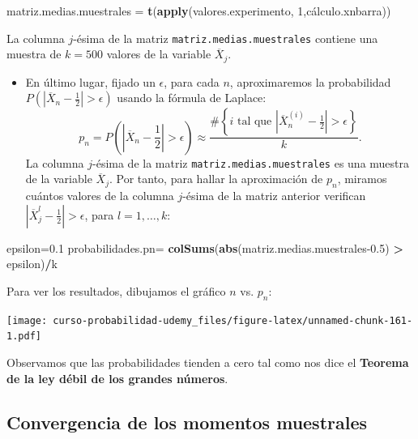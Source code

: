 \documentclass[]{book}
\newenvironment{Shaded}{\begin{snugshade}}{\end{snugshade}}
\newcommand{\DecValTok}[1]{\textcolor[rgb]{0.00,0.00,0.81}{#1}}
\newcommand{\FloatTok}[1]{\textcolor[rgb]{0.00,0.00,0.81}{#1}}
\newcommand{\KeywordTok}[1]{\textcolor[rgb]{0.13,0.29,0.53}{\textbf{#1}}}
\newcommand{\NormalTok}[1]{#1}
\newcommand{\OperatorTok}[1]{\textcolor[rgb]{0.81,0.36,0.00}{\textbf{#1}}}
\newcommand{\StringTok}[1]{\textcolor[rgb]{0.31,0.60,0.02}{#1}}
\providecommand{\tightlist}{%
  \setlength{\itemsep}{0pt}\setlength{\parskip}{0pt}}
\begin{document}
\begin{Shaded}
\begin{Highlighting}[]
\NormalTok{matriz.medias.muestrales =}\StringTok{ }\KeywordTok{t}\NormalTok{(}\KeywordTok{apply}\NormalTok{(valores.experimento,}
                                   \DecValTok{1}\NormalTok{,cálculo.xnbarra))}
\end{Highlighting}
\end{Shaded}

La columna \(j\)-ésima de la matriz \texttt{matriz.medias.muestrales} contiene una muestra de \(k=500\) valores de la variable \(\overline{X}_j\).

\begin{itemize}
\tightlist
\item
  En último lugar, fijado un \(\epsilon\), para cada \(n\), aproximaremos la probabilidad \(P\left(\left|\overline{X}_n-\frac{1}{2}\right|>\epsilon\right)\) usando la fórmula de Laplace:
  \[
  p_n=P\left(\left|\overline{X}_n-\frac{1}{2}\right|>\epsilon\right) \approx\frac{\#\left\{\mbox{$i$ tal que  $\left|\overline{X}_n^{(i)}-\frac{1}{2}\right|>\epsilon$}\right\}}{k}.
  \]
  La columna \(j\)-ésima de la matriz \texttt{matriz.medias.muestrales} es una muestra de la variable \(\overline{X}_j\). Por tanto, para hallar la aproximación de \(p_n\), miramos cuántos valores de la columna \(j\)-ésima de la matriz anterior verifican \(\left|\overline{X}_j^{l}-\frac{1}{2}\right|>\epsilon\), para \(l=1,\ldots, k\):
\end{itemize}

\begin{Shaded}
\begin{Highlighting}[]
\NormalTok{epsilon=}\FloatTok{0.1}
\NormalTok{probabilidades.pn=}\StringTok{ }\KeywordTok{colSums}\NormalTok{(}\KeywordTok{abs}\NormalTok{(matriz.medias.muestrales}\FloatTok{-0.5}\NormalTok{) }\OperatorTok{>}\StringTok{ }\NormalTok{epsilon)}\OperatorTok{/}\NormalTok{k}
\end{Highlighting}
\end{Shaded}

Para ver los resultados, dibujamos el gráfico \(n\) vs. \(p_n\):

\texttt{[image: curso-probabilidad-udemy\_files/figure-latex/unnamed-chunk-161-1.pdf]}

Observamos que las probabilidades tienden a cero tal como nos dice el \textbf{Teorema de la ley débil de los grandes números}.

\hypertarget{convergencia-de-los-momentos-muestrales}{%
\subsection{Convergencia de los momentos muestrales}\label{convergencia-de-los-momentos-muestrales}}
\end{document}
